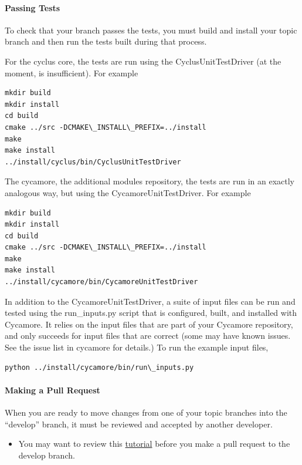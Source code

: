\documentclass[letterpaper,10pt,english]{sphinxmanual}
\begin{document}
\paragraph{Passing Tests}
\label{devdoc/contributing_to_cyclus:passing-tests}
To check that your branch passes the tests, you must build and install your topic
branch and then run the tests built during that process.

For the cyclus core, the tests are run using the CyclusUnitTestDriver (at the moment,
 is insufficient). For example

\begin{Verbatim}[commandchars=\\\{\}]
mkdir build
mkdir install
cd build
cmake ../src -DCMAKE\_INSTALL\_PREFIX=../install
make
make install
../install/cyclus/bin/CyclusUnitTestDriver
\end{Verbatim}

The cycamore, the additional modules repository, the tests are run in an exactly
analogous way, but using the CycamoreUnitTestDriver. For example

\begin{Verbatim}[commandchars=\\\{\}]
mkdir build
mkdir install
cd build
cmake ../src -DCMAKE\_INSTALL\_PREFIX=../install
make
make install
../install/cycamore/bin/CycamoreUnitTestDriver
\end{Verbatim}

In addition to the CycamoreUnitTestDriver, a suite of input files can be run and
tested using the run\_inputs.py script that is configured, built, and installed
with Cycamore. It relies on the input files that are part of your Cycamore
repository, and only succeeds for input files that are correct (some may have
known issues. See the issue list in cycamore for details.) To run the example
input files,

\begin{Verbatim}[commandchars=\\\{\}]
python ../install/cycamore/bin/run\_inputs.py
\end{Verbatim}


\paragraph{Making a Pull Request}
\label{devdoc/contributing_to_cyclus:making-a-pull-request}
When you are ready to move changes from one of your topic branches into the
``develop'' branch, it must be reviewed and accepted by another developer.
\begin{itemize}
\item {} 
You may want to review this \href{https://help.github.com/articles/using-pull-requests/}{tutorial}
before you make a pull request to the develop branch.

\end{itemize}
\end{document}
